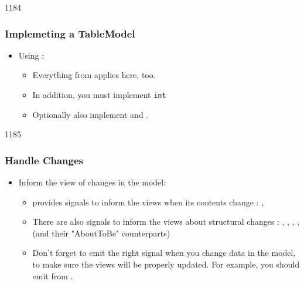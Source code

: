 \begin{slide}{1184}\frametitle{Implemeting a TableModel}
\begin{itemize}
\item Using :
  \begin{itemize}
  \item Everything from  applies here, too.
  \item In addition, you must implement \texttt{int} 
  \item Optionally also implement  and
    .
  \end{itemize}
\end{itemize}
\end{slide}

\begin{slide}{1185}\frametitle{Handle Changes}
\begin{itemize}
\item Inform the view of changes in the model:
  \begin{itemize}
  \item {} provides signals to inform the views when its contents change :
    ,  
  \item There are also signals to inform the views about structural changes :
    , ,
    , 
    , 
    (and their "AboutToBe" counterparts)
  \item Don't forget to emit the right signal when you change data in the model,
    to make sure the views will be properly updated. For example, you should emit
     from .
  \end{itemize}
\end{itemize}
\end{slide}

